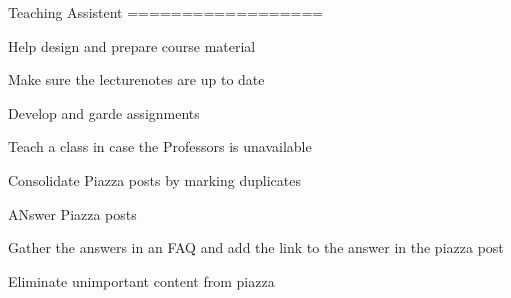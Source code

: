 Teaching Assistent
==================

Help design and prepare course material

Make sure the lecturenotes are up to date

Develop and garde assignments

Teach a class in case the Professors is unavailable

Consolidate Piazza posts by marking duplicates

ANswer Piazza posts

Gather the answers in an FAQ and add the link to the answer in the piazza post

Eliminate unimportant content from piazza

